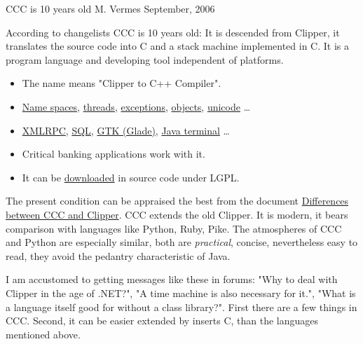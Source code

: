 
\pagetitle%
{CCC is 10 years old}%
{M. Vermes}%
{September, 2006}

\medskip

According to changelists CCC is 10 years old: It is descended from
Clipper, it translates the source code into C and a stack machine 
implemented in C. It is a program language and developing tool
independent of platforms.


\begin{itemize}
\item   
    The name means {"}Clipper to C++ Compiler".
\item 
    \href{http://ccc.comfirm.hu/ccc3/ccc-clipper-elteresek.html#NAMESPACE}{Name spaces}, 
    \href{http://ccc.comfirm.hu/ccc3/ccc-clipper-elteresek.html#THREADS}{threads}, 
    \href{http://ccc.comfirm.hu/ccc3/exception.html}{exceptions},
    \href{http://ccc.comfirm.hu/ccc3/objektum.html}{objects},
    \href{http://ccc.comfirm.hu/ccc3/ccc3_ujdonsagok.html}{unicode}
    \ldots
\item 
    \href{http://ccc.comfirm.hu/ccc3/xmlrpc-framework.html}{XMLRPC}, 
    \href{http://ccc.comfirm.hu/ccc3/sql2.html}{SQL}, 
    \href{http://ccc.comfirm.hu/ccc3/cccgtk.html}{GTK (Glade)},
    \href{http://ccc.comfirm.hu/ccc3/jterminal.html}{Java terminal} \ldots
\item
    Critical banking applications work with it.
\item   
    It can be 
    \href{http://ccc.comfirm.hu/ccc3/download/olvass.html}{downloaded} 
    in source code under LGPL.
\end{itemize}

The present condition can be appraised the best from the document 
\href{http://ccc.comfirm.hu/ccc3/ccc-clipper-elteresek.html}%
{Differences between CCC and Clipper}.
CCC extends the old Clipper.
It is modern, it bears comparison with languages like 
Python, Ruby, Pike.
The atmospheres of CCC and Python are especially similar, both are  
{\em practical}, concise, nevertheless easy to read, they avoid 
the pedantry characteristic of Java.

I am accustomed to getting messages like these in forums:  
{"}Why to deal with Clipper in the age of .NET?",  
{"}A time machine is also necessary for it.",
{"}What is a language itself good for without a class library?".
First there are a few things in CCC. Second, it can be easier extended
by inserts C, than the languages mentioned above.

